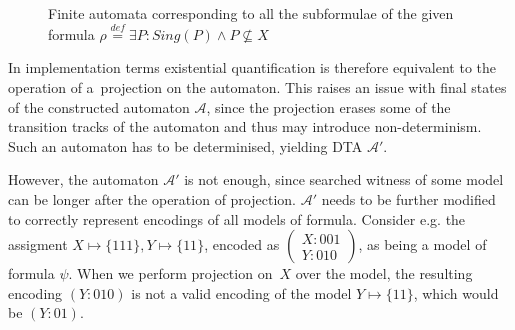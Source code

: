 \begin{figure}[h!]
\begin{center}
 \end{center}
 \caption{Finite automata corresponding to all the subformulae of the given
 formula $\rho \overset{\mathit{def}}{=} \exists P:
 Sing(P) \wedge P \not\subseteq X$}\label{automata}
\end{figure}
   \noindent\hrulefill
   
In implementation terms existential quantification is therefore equivalent to
the operation of a~projection on the automaton. This raises an issue with
final states of the constructed automaton $\mathcal{A}$, since the projection
erases some of the transition tracks of the automaton and thus may introduce
non-determinism. Such an automaton has to be determinised, yielding DTA
$\mathcal{A}'$.

However, the automaton $\mathcal{A}'$ is not enough, since searched witness of
some model can be longer after the operation of projection. $\mathcal{A}'$ needs
to be further modified to correctly represent encodings of all models of
formula.
Consider e.g. the assigment $X \mapsto \{111\}, Y \mapsto \{11\}$, encoded as
$(\substack{X:
001\\Y: 010})$, as being a model of formula $\psi$. When we perform projection
on~$X$ over the model, the resulting encoding $(Y: 010)$ is not a valid encoding of
the model $Y \mapsto \{11\}$, which would be $(Y: 01)$.

